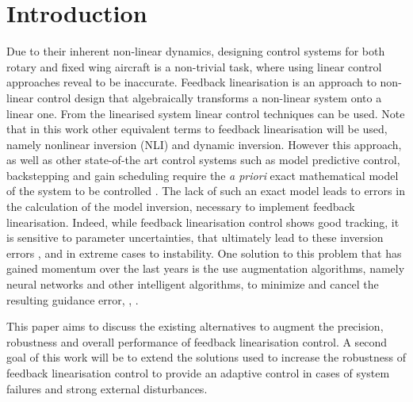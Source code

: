
\chapter{Introduction}
\label{chapter:introduction}

Due to their inherent non-linear dynamics, designing control systems for both rotary and fixed wing aircraft is a non-trivial task, where using linear control approaches reveal to be inaccurate. Feedback linearisation is an approach to non-linear control design that algebraically transforms a non-linear system onto a linear one. From the linearised system linear control techniques can be used. Note that in this work other equivalent terms to feedback linearisation will be used, namely nonlinear inversion (NLI) and dynamic inversion. 
However this approach, as well as other state-of-the art control systems such as model predictive control, backstepping and gain scheduling require the \textit{a priori} exact mathematical model of the system to be controlled \cite{SotA_IFCS}. The lack of such an exact model leads to errors in the calculation of the model inversion, necessary to implement feedback linearisation. Indeed, while feedback linearisation control shows good tracking, it is sensitive to parameter uncertainties, that ultimately lead to these inversion errors \cite{SotA_ControlAlgorithm}, and in extreme cases to instability. One solution to this problem that has gained momentum over the last years is the use augmentation algorithms, namely neural networks and other intelligent algorithms, to minimize and cancel the resulting guidance error\cite{NLI+NN}, \cite{NLI+NN_IFCS}, \cite{NLI+NN_chinese}. 

This paper aims to discuss the existing alternatives to augment the precision, robustness and overall performance of feedback linearisation control. A second goal of this work will be to extend the solutions used to increase the robustness of feedback linearisation control to provide an adaptive control in cases of system failures and strong external disturbances.



